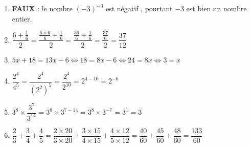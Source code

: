 \documentclass[oneside,12pt]{exam}          %
\begin{document}
\begin{enumerate}[itemsep = 3mm]
	\item \textbf{FAUX} : le nombre $(-3)^{-3}$ est négatif , pourtant $-3$ est bien un nombre entier.
	
	\item $\dfrac{6 + \frac{1}{6}}{2} = \dfrac{\frac{6 \times 6}{6} + \frac{1}{6}}{2} = \dfrac{\frac{36}{6} + \frac{1}{6}}{2} = \dfrac{\frac{37}{6}}{2} = \dfrac{37}{12}$
	
	\item $5x + 18 = 13x - 6 \Longleftrightarrow 18 = 8x -6 \Longleftrightarrow 24 = 8x \Longleftrightarrow 3 = x$
	
	\item $\dfrac{2^4}{4^5} = \dfrac{2^4}{(2^2)^5} =\dfrac{2^4}{2^{10}} = 2^{4-10} = 2^{-6}$
	
	\item $3^8 \times \dfrac{3^7}{3^{14}} = 3^8 \times 3^{7-14} = 3^8 \times 3^{-7} = 3^1 = 3$
	
	\item $\dfrac{2}{3} + \dfrac{3}{4} + \dfrac{4}{5} = 
	\dfrac{2 \times 20}{3 \times 20} + \dfrac{3 \times 15}{4 \times 15} + \dfrac{4 \times 12}{5 \times 12} =
	\dfrac{40}{60} + \dfrac{45}{60} + \dfrac{48}{60} = \dfrac{133}{60} $
\end{enumerate}
\end{document}
